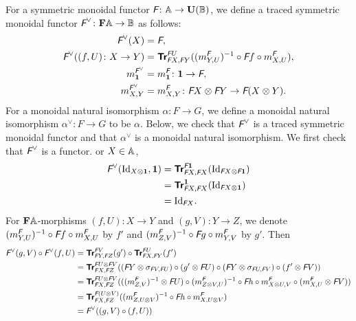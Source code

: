 For a symmetric monoidal functor $\textit{\textsf{F}} \colon \mathbb{A} \to
\mathbf{U}(\mathbb{B})$, we define a traced symmetric monoidal functor
$\textit{\textsf{F}}^{\vee} \colon \mathbf{F}\mathbb{A} \to \mathbb{B}$ as follows:
\begin{align*}
  \textit{\textsf{F}}^{\vee}(X) &= \textit{\textsf{F}}, \\
  \textit{\textsf{F}}^{\vee}((f,U) \colon X \to Y)
  &= {\normalfont\textsf{\textbf{Tr}}}^{\textit{\textsf{F}}U}_{\textit{\textsf{F}}X,\textit{\textsf{F}}Y}((m_{Y,U}^{\textit{\textsf{F}}})^{-1} \circ \textit{\textsf{F}}f
  \circ m^{\textit{\textsf{F}}}_{X,U}), \\
  m^{\textit{\textsf{F}}^{\vee}}_{\mathbf 1} &= m^{\textit{\textsf{F}}}_{\mathbf 1} \colon \mathbf 1 \to \textit{\textsf{F}}, \\
  m^{\textit{\textsf{F}}^{\vee}}_{X,Y} &= m^{\textit{\textsf{F}}}_{X,Y} \colon \textit{\textsf{F}}X \otimes \textit{\textsf{F}}Y
  \to \textit{\textsf{F}}(X \otimes Y).
\end{align*}
For a monoidal natural isomorphism $\alpha \colon F \to G$, we
define a monoidal natural isomorphism $\alpha^{\vee} \colon F \to G$
to be $\alpha$. Below, we check that $\textit{\textsf{F}}^{\vee}$ is a
traced symmetric monoidal functor and that $\alpha^{\vee}$ is a
monoidal natural isomorphism. We first check that $\textit{\textsf{F}}^{\vee}$
is a functor. or $X \in \mathbb{A}$,
\begin{align*}
  \textit{\textsf{F}}^{\vee}(\mbox{Id}_{X \otimes \mathbf 1},\mathbf 1)
  &= {\normalfont\textsf{\textbf{Tr}}}^{\textit{\textsf{F}}\mathbf 1}_{\textit{\textsf{F}}X,\textit{\textsf{F}}X}(\mbox{Id}_{\textit{\textsf{F}}X \otimes \textit{\textsf{F}}\mathbf 1}) \\
  &= {\normalfont\textsf{\textbf{Tr}}}^{\mathbf 1}_{\textit{\textsf{F}}X,\textit{\textsf{F}}X}(\mbox{Id}_{\textit{\textsf{F}}X \otimes \mathbf 1}) \\
  &= \mbox{Id}_{\textit{\textsf{F}}X}.
\end{align*}
For $\mathbf{F}\mathbb{A}$-morphisms $(f,U) \colon X \to Y$ and $(g,V)
\colon Y \to Z$, we denote $(m_{Y,U}^{\textit{\textsf{F}}})^{-1} \circ
\textit{\textsf{F}}f \circ m^{\textit{\textsf{F}}}_{X,U}$ by $f'$ and
$(m_{Z,V}^{\textit{\textsf{F}}})^{-1} \circ \textit{\textsf{F}}g \circ
m^{\textit{\textsf{F}}}_{Y,V}$ by $g'$. Then
\begin{align*}
  \textit{\textsf{F}}^{\vee}(g,V) \circ \textit{\textsf{F}}^{\vee}(f,U)
  &= {\normalfont\textsf{\textbf{Tr}}}^{\textit{\textsf{F}}V}_{\textit{\textsf{F}}Y,\textit{\textsf{F}}Z}(g') \circ
  {\normalfont\textsf{\textbf{Tr}}}^{\textit{\textsf{F}}U}_{\textit{\textsf{F}}X,\textit{\textsf{F}}Y}(f') \\
  &= {\normalfont\textsf{\textbf{Tr}}}^{\textit{\textsf{F}}U \otimes \textit{\textsf{F}}V}_{\textit{\textsf{F}}X,\textit{\textsf{F}}Z}
  ((\textit{\textsf{F}}Y \otimes \sigma_{\textit{\textsf{F}}V,\textit{\textsf{F}}U}) \circ
  (g' \otimes \textit{\textsf{F}}U) \circ (\textit{\textsf{F}}Y \otimes \sigma_{\textit{\textsf{F}}U,\textit{\textsf{F}}V}) \circ
  (f' \otimes \textit{\textsf{F}}V)) \\
  &= {\normalfont\textsf{\textbf{Tr}}}^{\textit{\textsf{F}}U \otimes \textit{\textsf{F}}V}_{\textit{\textsf{F}}X,\textit{\textsf{F}}Z}(((m_{Z,V}^{\textit{\textsf{F}}})^{-1}
  \otimes \textit{\textsf{F}}U) \circ
  (m_{Z \otimes V,U}^{\textit{\textsf{F}}})^{-1} \circ
  \textit{\textsf{F}}h \circ m_{X \otimes U,V}^{\textit{\textsf{F}}} \circ (m_{X,U}^{\textit{\textsf{F}}} \otimes \textit{\textsf{F}}V)) \\
  &= {\normalfont\textsf{\textbf{Tr}}}^{\textit{\textsf{F}}(U \otimes V)}_{\textit{\textsf{F}}X,\textit{\textsf{F}}Z}((m_{Z,U \otimes V}^{\textit{\textsf{F}}})^{-1} \circ
  \textit{\textsf{F}}h \circ m_{X, U \otimes V}^{\textit{\textsf{F}}}) \\
  &= \textit{\textsf{F}}^{\vee}((g,V) \circ (f,U))
\end{align*}
